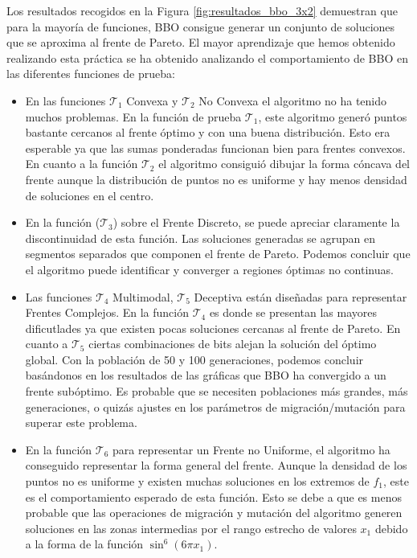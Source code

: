 \documentclass{article}
\begin{document}
Los resultados recogidos en la Figura \ref{fig:resultados_bbo_3x2} demuestran que para la mayoría de funciones, BBO consigue generar un conjunto de soluciones que se aproxima al frente de Pareto. El mayor aprendizaje que hemos obtenido realizando esta práctica se ha obtenido analizando el comportamiento de BBO en las diferentes funciones de prueba: \\
\begin{itemize}
    \item En las funciones $\mathcal{T}_1$ Convexa y $\mathcal{T}_2$ No Convexa el algoritmo no ha tenido muchos problemas. En la función de prueba $\mathcal{T}_1$, este algoritmo generó puntos bastante cercanos al frente óptimo y con una buena distribución. Esto era esperable ya que las sumas ponderadas funcionan bien para frentes convexos. En cuanto a la función $\mathcal{T}_2$ el algoritmo consiguió dibujar la forma cóncava del frente aunque la distribución de puntos no es uniforme y hay menos densidad de soluciones en el centro.
    \item En la función ($\mathcal{T}_3$) sobre el Frente Discreto, se puede apreciar claramente la discontinuidad de esta función. Las soluciones generadas se agrupan en segmentos separados que componen el frente de Pareto. Podemos concluir que el algoritmo puede identificar y converger a regiones óptimas no continuas.
    \item Las funciones $\mathcal{T}_4$ Multimodal, $\mathcal{T}_5$ Deceptiva están diseñadas para representar Frentes Complejos. En la función $\mathcal{T}_4$ es donde se presentan las mayores dificutlades ya que existen pocas soluciones cercanas al frente de Pareto. En cuanto a $\mathcal{T}_5$ ciertas combinaciones de bits alejan la solución del óptimo global. Con la población de 50 y 100 generaciones, podemos concluir basándonos en los resultados de las gráficas que BBO ha convergido a un frente subóptimo. Es probable que se necesiten poblaciones más grandes, más generaciones, o quizás ajustes en los parámetros de migración/mutación para superar este problema.
    \item En la función $\mathcal{T}_6$ para representar un Frente no Uniforme, el algoritmo ha conseguido representar la forma general del frente. Aunque la densidad de los puntos no es uniforme y existen muchas soluciones en los extremos de $f_1$, este es el comportamiento esperado de esta función. Esto se debe a que es menos probable que las operaciones de migración y mutación del algoritmo generen soluciones en las zonas intermedias por el rango estrecho de valores $x_1$ debido a la forma de la función $\sin^6(6\pi x_1)$.
\end{itemize}
\end{document}
